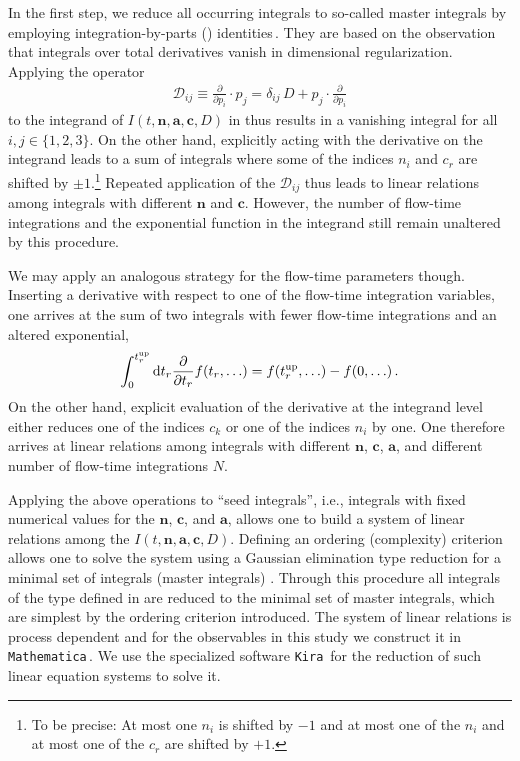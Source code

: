 In the first step, we reduce all occurring integrals to so-called master
integrals by employing integration-by-parts () identities\,\cite{Tkachov:1981wb,Chetyrkin:1981qh}.
They are based on the
observation that integrals over total derivatives vanish in dimensional
regularization. Applying the operator
\begin{equation}
  \begin{split}
    \mathcal{D}_{ij} \equiv \frac{\partial}{\partial p_i}\cdot p_j =
    \delta_{ij}\,D+ p_j\cdot \frac{\partial}{\partial p_i}
    \label{eq:dij}
  \end{split}
\end{equation}
to the integrand of $I(t,\mathbf{n},\mathbf{a},\mathbf{c},D)$ in
 thus results in a vanishing integral for all
$i,j\in\{1,2,3\}$. On the other hand, explicitly acting with the
derivative on the integrand leads to a sum of integrals where some of the
indices $n_i$ and $c_r$ are shifted by $\pm 1$.\footnote{To be
  precise: At most one $n_i$ is shifted by $-1$ and at most one of the
  $n_i$ and at most one of the $c_r$ are shifted by $+1$.} Repeated
application of the $\mathcal{D}_{ij}$ thus leads to linear relations
among integrals with different $\mathbf{n}$ and $\mathbf{c}$.
However, the number of flow-time integrations and the exponential
function in the integrand still remain unaltered by this procedure.

We may apply an analogous strategy for the flow-time parameters though.
Inserting a derivative with respect to one of the flow-time integration
variables, one arrives at the sum of two integrals with fewer flow-time
integrations and an altered exponential,
\begin{equation}
  \int_0^{t_{r}^\text{up}}{\rm d} t_r \frac{\partial }{\partial t_r} f(t_r,\ldots) = f(t_{r}^\text{up},\ldots)-f(0,\ldots)\,.
  \label{eq:ibpflow}
\end{equation}
On the other hand, explicit evaluation of the derivative at the
integrand level either reduces one of the indices $c_k$ or one of the indices $n_i$
by one. One therefore arrives at linear relations among integrals with
different $\mathbf{n}$, $\mathbf{c}$, $\mathbf{a}$, and different
number of flow-time integrations $N$.

Applying the above operations to ``seed integrals'', i.e., integrals
with fixed numerical values for the $\mathbf{n}$, $\mathbf{c}$, and
$\mathbf{a}$, allows one to build a system of linear relations among the
$I(t,\mathbf{n},\mathbf{a},\mathbf{c},D)$. Defining an ordering
(complexity) criterion allows one to solve the system using a Gaussian elimination
type reduction for a minimal set of integrals (master integrals) \cite{Laporta:2001dd}.
Through this procedure all integrals of the type defined in 
are reduced to the minimal set of master integrals, which are simplest
by the ordering criterion introduced. The system of linear relations
is process dependent and for the observables in this study we construct it
in \texttt{Mathematica}\,\cite{Mathematica11.3}. We use the specialized software
\texttt{Kira}\,\cite{Maierhoefer:2017hyi,Maierhofer:2018gpa} for the reduction of
such linear equation systems to solve it.

